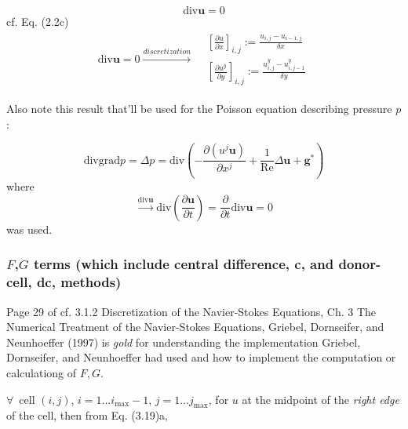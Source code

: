\documentclass[10pt]{amsart}
\begin{document}
\begin{multicols*}{2}
\begin{equation}
  \text{div}\mathbf{u} = 0
\end{equation}
cf. Eq. (2.2c)
\[
\begin{gathered}
  \text{div}\mathbf{u} = 0 \xrightarrow{ discretization } \begin{aligned}
    & \left[ \frac{ \partial u}{ \partial x} \right]_{i,j} := \frac{ u_{i,j} - u_{i-1,j} }{ \delta x} \\ 
    & \left[ \frac{ \partial u^y}{ \partial y} \right]_{i,j} := \frac{ u^y_{i,j} - u^y_{i,j-1} }{ \delta y}
    \end{aligned}
  \end{gathered}
\]

Also note this result that'll be used for the Poisson equation describing pressure $p$:

\begin{equation}
  \boxed{
\text{div}\text{grad} p = \Delta p = \text{div} \left( - \frac{ \partial (u^j \mathbf{u} )}{ \partial x^j} + \frac{1}{\text{Re} }\Delta \mathbf{u} + \mathbf{g}^* \right)
    }
  \end{equation}
where
\[
\xrightarrow{ \text{div}\mathbf{u} } \text{div} \left( \frac{ \partial \mathbf{u} }{ \partial t} \right) = \frac{ \partial }{ \partial t} \text{div}\mathbf{u} = 0 
\]
was used.  

\subsubsection{$F$,$G$ terms (which include central difference, c, and donor-cell, dc, methods)}

Page 29 of cf. 3.1.2 Discretization of the Navier-Stokes Equations, Ch. 3 The Numerical Treatment of the Navier-Stokes Equations, Griebel, Dornseifer, and Neunhoeffer (1997) \cite{GDN1997} is \emph{gold} for understanding the implementation Griebel, Dornseifer, and Neunhoeffer had used and how to implement the computation or calculationg of $F,G$.

$\forall \, $ cell $(i,j)$, $i=1 \dots i_{\text{max}} - 1$, $j=1 \dots j_{\text{max}}$, for $u$ at the midpoint of the \emph{right edge} of the cell, then from Eq. (3.19)a,


\end{multicols*}
\end{document}
